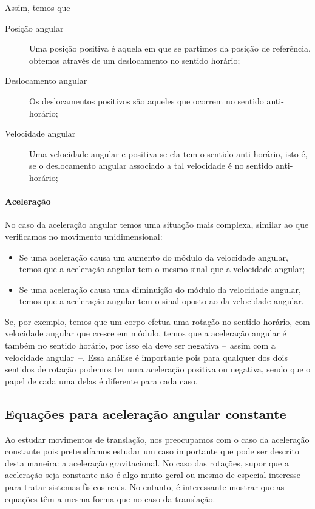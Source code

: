 Assim, temos que
\begin{description}
    \item[Posição angular] Uma posição positiva é aquela em que se partimos da posição de referência, obtemos através de um deslocamento no sentido horário;
    \item[Deslocamento angular] Os deslocamentos positivos são aqueles que ocorrem no sentido anti-horário;
    \item[Velocidade angular] Uma velocidade angular e positiva se ela tem o sentido anti-horário, isto é, se o deslocamento angular associado a tal velocidade é no sentido anti-horário;
\end{description}

\paragraph{Aceleração}

No caso da aceleração angular temos uma situação mais complexa, similar ao que verificamos no movimento unidimensional:
\begin{itemize}
    \item Se uma aceleração causa um aumento do módulo da velocidade angular, temos que a aceleração angular tem o mesmo sinal que a velocidade angular;
    \item Se uma aceleração causa uma diminuição do módulo da velocidade angular, temos que a aceleração angular tem o sinal oposto ao da velocidade angular.
\end{itemize}
%
Se, por exemplo, temos que um corpo efetua uma rotação no sentido horário, com velocidade angular que cresce em módulo, temos que a aceleração angular é também no sentido horário, por isso ela deve ser negativa --~assim com a velocidade angular~--. Essa análise é importante pois para qualquer dos dois sentidos de rotação podemos ter uma aceleração positiva ou negativa, sendo que o papel de cada uma delas é diferente para cada caso.

\subsection{Equações para aceleração angular constante}

Ao estudar movimentos de translação, nos preocupamos com o caso da aceleração constante pois pretendíamos estudar um caso importante que pode ser descrito desta maneira: a aceleração gravitacional. No caso das rotações, supor que a aceleração seja constante não é algo muito geral ou mesmo de especial interesse para tratar sistemas físicos reais. No entanto, é interessante mostrar que as equações têm a mesma forma que no caso da translação.


